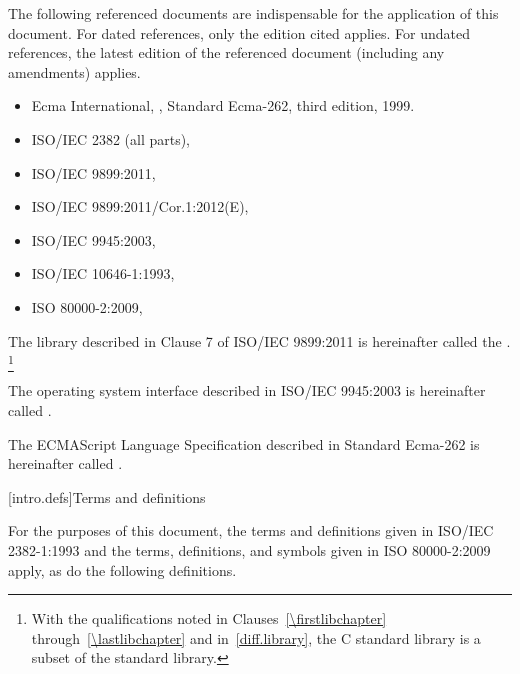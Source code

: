 \pnum
{}%
The following referenced documents are indispensable for the application
of this document. For dated references, only the edition cited applies.
For undated references, the latest edition of the referenced document
(including any amendments) applies.

\begin{itemize}
\item Ecma International, ,
Standard Ecma-262, third edition, 1999.
\item ISO/IEC 2382 (all parts), 
\item ISO/IEC 9899:2011, 
\item ISO/IEC 9899:2011/Cor.1:2012(E), 
\item ISO/IEC 9945:2003, 
\item ISO/IEC 10646-1:1993, 
\item ISO 80000-2:2009, 
\end{itemize}

\pnum
The library described in Clause 7 of ISO/IEC 9899:2011
is hereinafter called the
.%
\footnote{With the qualifications noted in Clauses~\ref{\firstlibchapter}
through~\ref{\lastlibchapter} and in~\ref{diff.library}, the C standard
library is a subset of the \Cpp standard library.}

\pnum
The operating system interface described in ISO/IEC 9945:2003 is
hereinafter called .

\pnum
The ECMAScript Language Specification described in Standard Ecma-262 is
hereinafter called .

[intro.defs]{Terms and definitions}

\pnum
{}%
For the purposes of this document,
the terms and definitions
given in ISO/IEC 2382-1:1993 and
the terms, definitions, and symbols
given in ISO 80000-2:2009 apply,
as do the following definitions.

